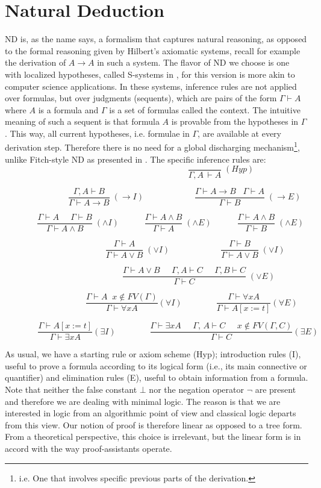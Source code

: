 \documentclass[a4paper,UKenglish]{lipics}
\newcommand{\G}{\Gamma}
\newcommand{\fa}{\forall}
\newcommand{\ex}{\exists}
\begin{document}
\section{Natural Deduction}
ND is, as the name says, a formalism that captures natural reasoning, as opposed to the formal reasoning given by Hilbert's axiomatic systems, recall for example the derivation of $A\to A$ in such a system.  The flavor of ND we choose is one with localized hypotheses, called S-systems in \cite{indr}, for this version is more akin to computer science applications. In these systems, inference rules are not applied over formulas, but over judgments (sequents), which are pairs of the form $\G\vdash A$ where $A$ is a formula and $\G$ is a set of formulas called the context.
The intuitive meaning of such a sequent is that formula $A$ is provable from the hypotheses in $\G$. This way, all current hypotheses, i.e. formulae in $\G$,  are available at every derivation step. Therefore there is no need for a global discharging mechanism\footnote{i.e. One that involves specific previous parts of the derivation.}, unlike Fitch-style ND as presented in \cite{hr,mh}. The specific inference rules are: 
\[
\mspace{275mu} \frac{}{\G,A\,\vdash A}\;(Hyp)
\]

\[
\mspace{120mu} \frac{\Gamma,A\vdash  B}{\Gamma\vdash A\rightarrow  B}\;(\rightarrow\! I) \qquad \qquad \qquad
\frac{\Gamma\vdash A\rightarrow  B\;\;\;\Gamma\vdash A}{\Gamma\vdash  B}\;(\rightarrow E)
\]

\[
\mspace{60mu} \frac{\G\vdash A\;\;\;\;\;\G\vdash B}{\G\vdash A\land
   B}\;(\land I) \qquad \quad
\frac{\G\vdash A\land B}{\G\vdash A}\;(\land E)\qquad \quad
\frac{\G\vdash A\land B}{\G\vdash B}\;(\land E)
\]

\[
\mspace{165mu} \frac{\G\vdash A}{\G\vdash A\lor B}\;(\lor I)\qquad \qquad \qquad
\frac{\G\vdash B}{\G\vdash A\lor B}\;(\lor I)
\]

\[ 
\mspace{190mu}\frac{\G\vdash A\lor B\;\;\;\;\;\G,A\vdash
  C\;\;\;\;\;\G, B\vdash C}
{\G\vdash C}\;(\lor E)\;\;
\]

\[
\mspace{150mu} \frac{\G\vdash A\;\; x\notin FV(\G)}{\G\vdash \fa x A}(\fa I) \qquad \qquad
\frac{\G\vdash \fa x A}{\G\vdash A[x:=t]}(\fa E)
\]

\[
\mspace{70mu}\frac{\G\vdash A[x:=t]}{\G\vdash \ex x A}(\ex I) \qquad \qquad
\frac{\G\vdash \ex x A\;\;\;\;\;\G,\, A\vdash C \;\;\;\;\;x\notin FV(\G,C)}
{\G\vdash C}(\ex E)
\]

As usual, we have a starting rule or axiom scheme (Hyp); introduction rules (I), useful to prove a formula according to its logical form (i.e., its main connective or quantifier) and elimination rules (E), useful to obtain information from a formula. Note that neither the false constant $\bot$
 nor the negation operator $\neg$ are present and therefore we are dealing
with minimal logic. The reason is that we are interested in logic from an
algorithmic point of view and classical logic departs from this
view. Our notion of proof is therefore linear as opposed to a tree form.
From a theoretical perspective, this choice is irrelevant, but the linear
form is in accord with the way proof-assistants operate.
\end{document}
